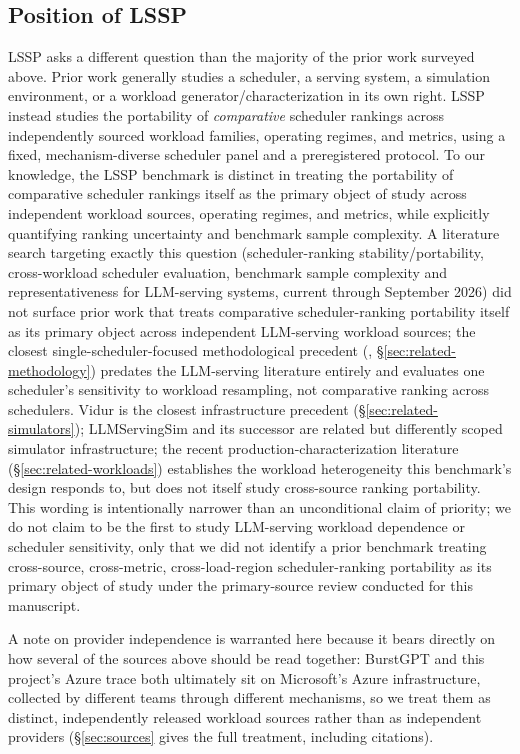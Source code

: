 \documentclass[sn-basic,Numbered,pdflatex]{sn-jnl}
\begin{document}
\subsection{Position of LSSP}
\label{sec:related-position}

LSSP asks a different question than the majority of the prior work surveyed
above. Prior work generally studies a scheduler, a serving system, a
simulation environment, or a workload generator/characterization in its own
right. LSSP instead studies the portability of \emph{comparative} scheduler
rankings across independently sourced workload families, operating regimes,
and metrics, using a fixed, mechanism-diverse scheduler panel and a
preregistered protocol. To our knowledge, the LSSP benchmark is distinct in
treating the portability of comparative scheduler rankings itself as the
primary object of study across independent workload sources, operating
regimes, and metrics, while explicitly quantifying ranking uncertainty and
benchmark sample complexity. A literature search targeting exactly this
question (scheduler-ranking stability/portability, cross-workload
scheduler evaluation, benchmark sample complexity and representativeness
for LLM-serving systems, current through September 2026) did not surface
prior work that treats comparative scheduler-ranking portability itself as
its primary object across independent LLM-serving workload sources; the
closest single-scheduler-focused methodological precedent
(\citet{zakay2014resampling}, \S\ref{sec:related-methodology}) predates
the LLM-serving literature entirely and evaluates one scheduler's
sensitivity to workload resampling, not comparative ranking across
schedulers. Vidur is the closest infrastructure precedent
(\S\ref{sec:related-simulators}); LLMServingSim and its successor are
related but differently scoped simulator infrastructure; the recent
production-characterization literature
(\S\ref{sec:related-workloads}) establishes the workload heterogeneity this
benchmark's design responds to, but does not itself study cross-source
ranking portability. This wording is intentionally narrower than an
unconditional claim of priority; we do not claim to be the first to study
LLM-serving workload dependence or scheduler sensitivity, only that we did
not identify a prior benchmark treating cross-source, cross-metric,
cross-load-region scheduler-ranking portability as its primary object of
study under the primary-source review conducted for this manuscript.

A note on provider independence is warranted here because it bears
directly on how several of the sources above should be read together:
BurstGPT and this project's Azure trace both ultimately sit on Microsoft's
Azure infrastructure, collected by different teams through different
mechanisms, so we treat them as distinct, independently released workload
sources rather than as independent providers
(\S\ref{sec:sources} gives the full treatment, including citations).
\end{document}
